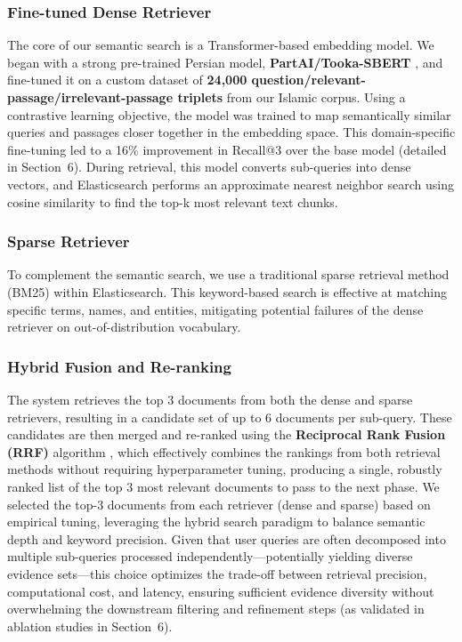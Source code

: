 \documentclass[11pt]{article}
\begin{document}
\subsubsection{Fine-tuned Dense Retriever}

The core of our semantic search is a Transformer-based embedding model. We began with a strong pre-trained Persian model, \textbf{PartAI/Tooka-SBERT} \cite{PartAITooka}, and fine-tuned it on a custom dataset of \textbf{24,000 question/relevant-passage/irrelevant-passage triplets} from our Islamic corpus. Using a contrastive learning objective, the model was trained to map semantically similar queries and passages closer together in the embedding space. This domain-specific fine-tuning led to a 16\% improvement in Recall@3 over the base model (detailed in Section~6). During retrieval, this model converts sub-queries into dense vectors, and Elasticsearch performs an approximate nearest neighbor search using cosine similarity to find the top-k most relevant text chunks.

\subsubsection{Sparse Retriever}

To complement the semantic search, we use a traditional sparse retrieval method (BM25) within Elasticsearch. This keyword-based search is effective at matching specific terms, names, and entities, mitigating potential failures of the dense retriever on out-of-distribution vocabulary.

\subsubsection{Hybrid Fusion and Re-ranking}

The system retrieves the top 3 documents from both the dense and sparse retrievers, resulting in a candidate set of up to 6 documents per sub-query. These candidates are then merged and re-ranked using the \textbf{Reciprocal Rank Fusion (RRF)} algorithm \cite{cormack2009reciprocal}, which effectively combines the rankings from both retrieval methods without requiring hyperparameter tuning, producing a single, robustly ranked list of the top 3 most relevant documents to pass to the next phase. We selected the top-3 documents from each retriever (dense and sparse) based on empirical tuning, leveraging the hybrid search paradigm to balance semantic depth and keyword precision. Given that user queries are often decomposed into multiple sub-queries processed independently---potentially yielding diverse evidence sets---this choice optimizes the trade-off between retrieval precision, computational cost, and latency, ensuring sufficient evidence diversity without overwhelming the downstream filtering and refinement steps (as validated in ablation studies in Section~6).
\end{document}
